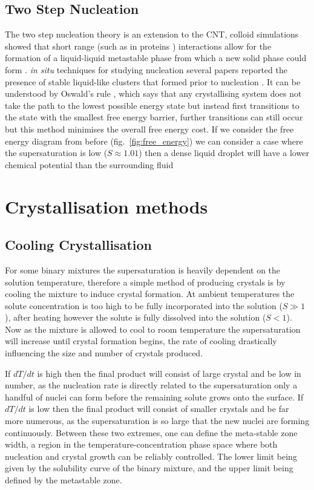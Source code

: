 \subsection{Two Step Nucleation}
The two step nucleation theory is an extension to the CNT, colloid simulations showed that short range (such as in proteins \cite{Wolde1997, Gliko2005}) interactions allow for the formation of a liquid-liquid metastable phase from which a new solid phase could form \cite{Anderson2002, Karthika2016}. \textit{in situ} techniques for studying nucleation several papers reported the presence of stable liquid-like clusters that formed prior to nucleation \cite{Savage2009, Wolde1997, Soga1999}.  It can be understood by Oswald's rule \cite{Ostwald1897}, which says that any crystallising system does not 
take the path to the lowest possible energy state but instead first transitions to the state with the smallest free energy barrier, further transitions can still occur but this method minimises the overall free energy cost. If we consider the free energy diagram from before (fig.~\ref{fig:free_energy}) we can consider a case where the supersaturation is low ($S\approx1.01$) then a dense liquid droplet will have a lower chemical potential than the surrounding fluid 

\section{Crystallisation methods}
\subsection{Cooling Crystallisation}
For some binary mixtures the supersaturation is heavily dependent on 
the solution temperature, therefore a simple method of producing crystals 
is by cooling the mixture to induce crystal formation. At ambient 
temperatures the solute concentration is too high to be fully incorporated
into the solution ($S\gg 1$), after heating however the solute is fully dissolved
into the solution ($S<1$). Now as the mixture is allowed to cool to room
temperature the supersaturation will increase until crystal formation begins,
the rate of cooling drastically influencing the size and number of crystals
produced.

If $dT/dt$ is high then the final product will consist of large 
crystal and be low in number, as the nucleation rate is directly related
to the supersaturation only a handful of nuclei can form before the remaining
solute grows onto the surface. If $dT/dt$ is low then the final product will 
consist of smaller crystals and be far more numerous, as the supersaturation 
is so large that the new nuclei are forming continuously. Between these two 
extremes, one can define the meta-stable zone width, a region in the 
temperature-concentration phase space where both nucleation and crystal growth
can be reliably controlled. The lower limit being given by the solubility curve
of the binary mixture, and the upper limit being defined by the metastable zone.

